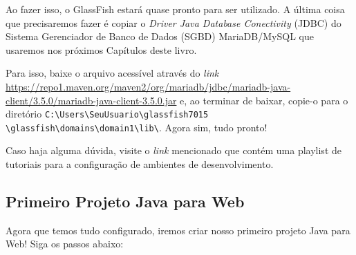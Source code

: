 Ao fazer isso, o GlassFish estará quase pronto para ser utilizado. A última coisa que precisaremos fazer é copiar o \textit{Driver Java Database Conectivity} (JDBC) do Sistema Gerenciador de Banco de Dados (SGBD) MariaDB/MySQL que usaremos nos próximos Capítulos deste livro.

Para isso, baixe o arquivo acessível através do \textit{link} \url{https://repo1.maven.org/maven2/org/mariadb/jdbc/mariadb-java-client/3.5.0/mariadb-java-client-3.5.0.jar} e, ao terminar de baixar, copie-o para o diretório \texttt{C:\textbackslash Users\textbackslash SeuUsuario\textbackslash glassfish7015\\\textbackslash glassfish\textbackslash domains\textbackslash domain1\textbackslash lib\textbackslash}. Agora sim, tudo pronto!

Caso haja alguma dúvida, visite o \textit{link} mencionado que contém uma playlist de tutoriais para a configuração de ambientes de desenvolvimento.


\subsection{Primeiro Projeto Java para Web}\label{subsec:primeiroProjeto}

Agora que temos tudo configurado, iremos criar nosso primeiro projeto Java para Web! Siga os passos abaixo:

